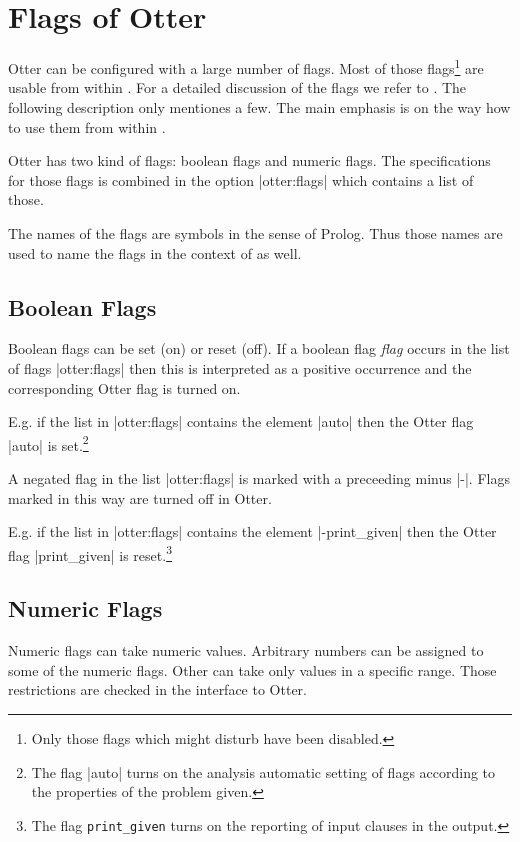 \section{Flags of Otter}\label{otter:flags}

Otter can be configured with a large number of flags. Most of those
flags\footnote{Only those flags which might disturb \ProTop{} have been
  disabled.} are usable from within \ProTop. For a detailed discussion of the
flags we refer to \cite{mccune:otter}. The following description only
mentiones a few. The main emphasis is on the way how to use them from within
\ProTop.

Otter has two kind of flags: boolean flags and numeric flags. The
specifications for those flags is combined in the option |otter:flags| which
contains a list of those.

The names of the flags are symbols in the sense of Prolog. Thus those names
are used to name the flags in the context of \ProTop{} as well.

\subsection{Boolean Flags}

Boolean flags can be set (on) or reset (off). If a boolean flag {\em flag}
occurs in the list of flags |otter:flags| then this is interpreted as a
positive occurrence and the corresponding Otter flag is turned on.

E.g. if the list in |otter:flags| contains the element |auto| then the Otter
flag |auto| is set.\footnote{The flag |auto| turns on the analysis automatic
  setting of flags according to the properties of the problem given.}

A negated flag in the list |otter:flags| is marked with a preceeding minus
|-|. Flags marked in this way are turned off in Otter.

E.g. if the list in |otter:flags| contains the element |-print_given| then the
Otter flag |print_given| is reset.\footnote{The flag {\tt print\_given} turns
  on the reporting of input clauses in the output.}


\subsection{Numeric Flags}

Numeric flags can take numeric values. Arbitrary numbers can be assigned to
some of the numeric flags. Other can take only values in a specific
range. Those restrictions are checked in the \ProTop{} interface to Otter.

